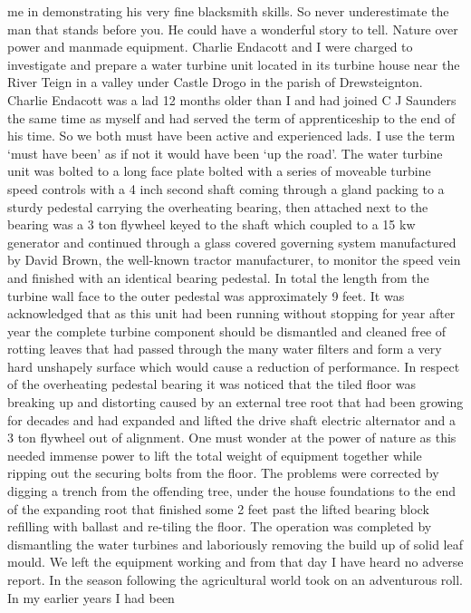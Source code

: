 me in demonstrating his very fine blacksmith skills. So never underestimate the
man that stands before you. He could have a wonderful story to tell. Nature
over power and manmade equipment. Charlie Endacott and I were charged to
investigate and prepare a water turbine unit located in its turbine house near
the River Teign in a valley under Castle Drogo in the parish of Drewsteignton.
Charlie Endacott was a lad 12 months older than I and had joined C J Saunders
the same time as myself and had served the term of apprenticeship to the end of
his time. So we both must have been active and experienced lads. I use the
term ‘must have been' as if not it would have been ‘up the road'. The water
turbine unit was bolted to a long face plate bolted with a series of moveable
turbine speed controls with a 4 inch second shaft coming through a gland
packing to a sturdy pedestal carrying the overheating bearing, then attached
next to the bearing was a 3 ton flywheel keyed to the shaft which coupled to a
15 kw generator and continued through a glass covered governing system
manufactured by David Brown, the well-known tractor manufacturer, to monitor
the speed vein      and finished with an identical bearing pedestal. In total
the length from the turbine wall face to the outer pedestal was approximately 9
feet. It was acknowledged that as this unit had been running without stopping
for year after year the complete turbine component should be dismantled and
cleaned free of rotting leaves that had passed through the many water filters
and form a very hard unshapely surface which would cause a reduction of
performance. In respect of the overheating pedestal bearing it was noticed that
the tiled floor was breaking up and distorting caused by an external tree root
that had been growing for decades and had expanded and lifted the drive shaft
electric alternator and a 3 ton flywheel out of alignment. One must wonder at
the power of nature as this needed immense power to lift the total weight of
equipment together while ripping out the securing bolts from the floor. The
problems were corrected by digging a trench from the offending tree, under the
house foundations to the end of the expanding root that finished some 2 feet
past the lifted bearing block refilling with ballast and re-tiling the floor.
The operation was completed by dismantling the water turbines and laboriously
removing the build up of solid leaf mould. We left the equipment working and
from that day I have heard no adverse report. In the season following the
agricultural world took on an adventurous roll. In my earlier years I had been
